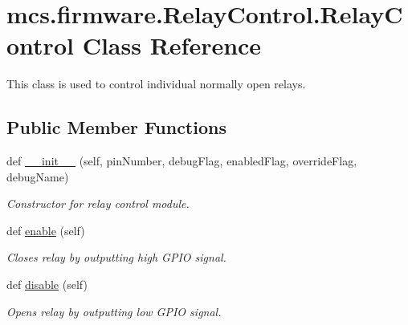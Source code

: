 \hypertarget{classmcs_1_1firmware_1_1RelayControl_1_1RelayControl}{}\section{mcs.\+firmware.\+Relay\+Control.\+Relay\+Control Class Reference}
\label{classmcs_1_1firmware_1_1RelayControl_1_1RelayControl}


This class is used to control individual normally open relays.  


\subsection*{Public Member Functions}
\begin{DoxyCompactItemize}
\item 
def \hyperlink{classmcs_1_1firmware_1_1RelayControl_1_1RelayControl_aefe5ade8212d8cd292790a65d1ddc539}{\+\_\+\+\_\+init\+\_\+\+\_\+} (self, pin\+Number, debug\+Flag, enabled\+Flag, override\+Flag, debug\+Name)
\begin{DoxyCompactList}\small\item\em Constructor for relay control module. \end{DoxyCompactList}\item 
\mbox{\label{classmcs_1_1firmware_1_1RelayControl_1_1RelayControl_a4429d108e4283b2daaeabd302a40616d}} 
def \hyperlink{classmcs_1_1firmware_1_1RelayControl_1_1RelayControl_a4429d108e4283b2daaeabd302a40616d}{enable} (self)
\begin{DoxyCompactList}\small\item\em Closes relay by outputting high G\+P\+IO signal. \end{DoxyCompactList}\item 
\mbox{\label{classmcs_1_1firmware_1_1RelayControl_1_1RelayControl_ab1a16c37e9de0fab604ed2e27566bbac}} 
def \hyperlink{classmcs_1_1firmware_1_1RelayControl_1_1RelayControl_ab1a16c37e9de0fab604ed2e27566bbac}{disable} (self)
\begin{DoxyCompactList}\small\item\em Open\textquotesingle{}s relay by outputting low G\+P\+IO signal. \end{DoxyCompactList}\end{DoxyCompactItemize}
